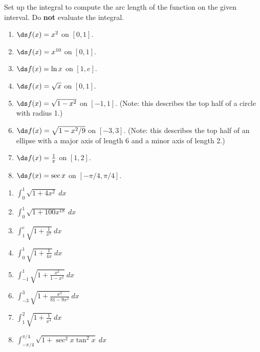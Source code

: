 \begin{enumialphparenastyle}
\begin{ex}
\end{ex}

\begin{ex}
Set up the integral to compute the arc length of the function on the given interval. Do \textbf{not} evaluate the integral. \label{ex_al1}
\begin{enumerate}
\item {$\ds f(x) = x^2$ on $[0, 1]$.\label{ex_07_04_ex_13}}


\item {$\ds f(x) = x^{10}$ on $[0, 1]$.}


\item {$\ds f(x) = \ln x$ on $[1, e]$.}


\item {$\ds f(x) = \sqrt{x}$ on $[0, 1]$.}


\item {$\ds f(x) = \sqrt{1-x^2}$ on $[-1, 1]$. (Note: this describes the top half of a circle with radius 1.)}


\item {$\ds f(x) = \sqrt{1-x^2/9}$ on $[-3, 3]$. (Note: this describes the top half of an ellipse with a major axis of length $ 6 $ and a minor axis of length $ 2 $.)}
\item {$\ds f(x) = \frac1x$ on $[1,2]$.}

\item {$\ds f(x) = \sec x$ on $[-\pi/4,\pi/4]$.\label{ex_07_04_ex_20}}

\end{enumerate}

\begin{sol}
\begin{enumerate}
\item {$\int_0^1 \sqrt{1+4x^2}\ dx$}
\item {$\int_0^1 \sqrt{1+100x^{18}}\ dx$}
\item {$\int_1^e \sqrt{1+\frac1{x^2}}\ dx$}
\item {$\int_0^1 \sqrt{1+\frac{1}{4x}}\ dx$}
\item {$\int_{-1}^1 \sqrt{1+\frac{x^2}{1-x^2}}\ dx$}
\item 
{$\int_{-3}^3 \sqrt{1+\frac{x^2}{81-9x^2}}\ dx$}

\item {$\int_{1}^2 \sqrt{1+\frac1{x^4}}\ dx$}
\item {$\int_{-\pi/4}^{\pi/4} \sqrt{1+\sec^2x\tan^2x}\ dx$}

\end{enumerate}
\end{sol}


\end{ex}
\end{enumialphparenastyle}
